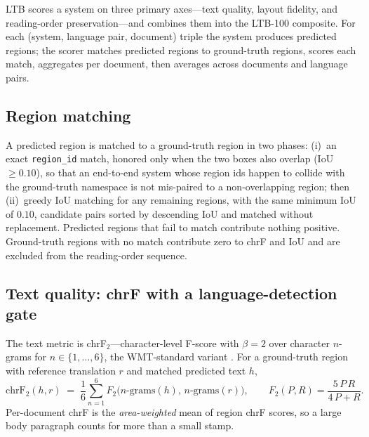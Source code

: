 \documentclass[11pt]{article}
\begin{document}
LTB scores a system on three primary axes---text quality, layout fidelity, and
reading-order preservation---and combines them into the LTB-100 composite. For
each (system, language pair, document) triple the system produces predicted
regions; the scorer matches predicted regions to ground-truth regions, scores
each match, aggregates per document, then averages across documents and language
pairs.

\subsection{Region matching}

A predicted region is matched to a ground-truth region in two phases:
(i)~an exact \texttt{region\_id} match, honored only when the two boxes also
overlap (IoU~$\geq 0.10$), so that an end-to-end system whose region ids happen
to collide with the ground-truth namespace is not mis-paired to a
non-overlapping region; then (ii)~greedy IoU matching for any remaining regions,
with the same minimum IoU of $0.10$, candidate pairs sorted by descending IoU
and matched without replacement. Predicted regions that fail to match contribute nothing positive.
Ground-truth regions with no match contribute zero to chrF and IoU and are
excluded from the reading-order sequence.

\subsection{Text quality: chrF with a language-detection gate}

The text metric is chrF$_2$---character-level F-score with $\beta=2$ over
character $n$-grams for $n \in \{1,\dots,6\}$, the WMT-standard variant
\citep{popovic2015chrf}. For a ground-truth region with reference translation
$r$ and matched predicted text $h$,
\begin{equation}
\mathrm{chrF}_2(h, r) \;=\; \frac{1}{6}\sum_{n=1}^{6} F_2\big(\text{$n$-grams}(h),\,\text{$n$-grams}(r)\big),
\qquad
F_2(P,R) = \frac{5\,P\,R}{4\,P + R}.
\end{equation}
Per-document chrF is the \emph{area-weighted} mean of region chrF scores, so a
large body paragraph counts for more than a small stamp.
\end{document}
